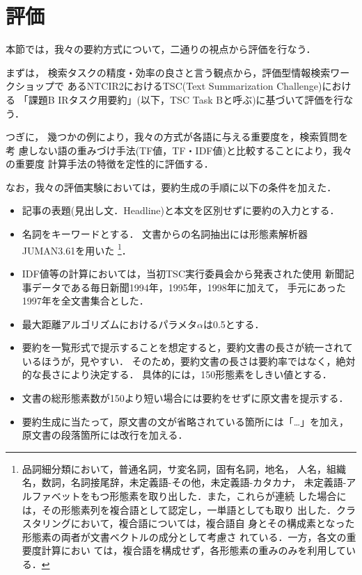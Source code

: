\section{評価}
\label{Sec:評価}

本節では，我々の要約方式について，二通りの視点から評価を行なう．

まずは，
検索タスクの精度・効率の良さと言う観点から，評価型情報検索ワークショップで
あるNTCIR2\cite{NTCIR}におけるTSC(Text Summarization Challenge)における
「課題B IRタスク用要約」(以下，TSC Task Bと呼ぶ)に基づいて評価を行なう\cite{TSC_new_J,難波:第2回NTCIRワークショップ自動要約タスクの結果および評価法の分析}．

つぎに，
幾つかの例により，我々の方式が各語に与える重要度を，検索質問を考
慮しない語の重みづけ手法(TF値，TF・IDF値)と比較することにより，我々の重要度
計算手法の特徴を定性的に評価する．

なお，我々の評価実験においては，要約生成の手順に以下の条件を加えた．
\begin{itemize}
 \item 記事の表題(見出し文．Headline)と本文を区別せずに要約の入力とする．
 \item 名詞をキーワードとする．
       文書からの名詞抽出には形態素解析器JUMAN3.61\cite{juman3.61}を用いた
       \footnote{品詞細分類において，普通名詞，サ変名詞，固有名詞，地名，
       人名，組織名，数詞，名詞接尾辞，未定義語-その他，未定義語-カタカナ，
       未定義語-アルファベットをもつ形態素を取り出した．また，これらが連続
       した場合には，その形態素列を複合語として認定し，一単語としても取り
       出した．クラスタリングにおいて，複合語については，複合語自
       身とその構成素となった形態素の両者が文書ベクトルの成分として考慮さ
       れている．一方，各文の重要度計算におい
       ては，複合語を構成せず，各形態素の重みのみを利用している．}．
 \item IDF値等の計算においては，当初TSC実行委員会から発表された使用
       新聞記事データである毎日新聞1994年，1995年，1998年に加えて，
       手元にあった1997年を全文書集合とした．
 \item 最大距離アルゴリズムにおけるパラメタ$\alpha$は0.5とする．
 \item 要約を一覧形式で提示することを想定すると，要約文書の長さが統一されているほうが，見やすい．
       そのため，要約文書の長さは要約率ではなく，絶対的な長さにより決定する．
       具体的には，150形態素をしきい値とする．
 \item 文書の総形態素数が150より短い場合には要約をせずに原文書を提示する．
 \item 要約生成に当たって，原文書の文が省略されている箇所には「…」を加え，
       原文書の段落箇所には改行を加える．
\end{itemize}


